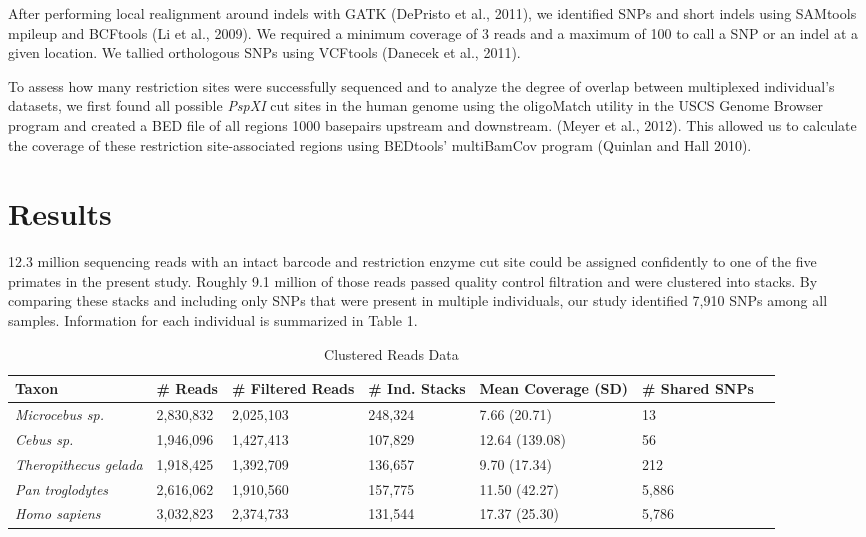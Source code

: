 \documentclass[12pt]{article}
\begin{document}
After performing local realignment around indels with GATK (DePristo et al., 2011), we identified SNPs and short indels using SAMtools mpileup and BCFtools (Li et al., 2009). We required a minimum coverage of 3 reads and a maximum of 100 to call a SNP or an indel at a given location. We tallied orthologous SNPs using VCFtools (Danecek et al., 2011).
	
To assess how many restriction sites were successfully sequenced and to analyze the degree of overlap between multiplexed individual's datasets, we first found all possible \emph{PspXI} cut sites in the human genome using the oligoMatch utility in the USCS Genome Browser program and created a BED file of all regions 1000 basepairs upstream and downstream. (Meyer et al., 2012). This allowed us to calculate the coverage of these restriction site-associated regions using BEDtools' multiBamCov program (Quinlan and Hall 2010).

\section{Results}

12.3 million sequencing reads with an intact barcode and restriction enzyme cut site could be assigned confidently to one of the five primates in the present study. Roughly 9.1 million of those reads passed quality control filtration and were clustered into stacks. By comparing these stacks and including only SNPs that were present in multiple individuals, our study identified 7,910 SNPs among all samples. Information for each individual is summarized in Table 1. 

\begin{table}[h]
\caption{Clustered Reads Data}
\begin{center}
	\small
	\begin{tabular}{ p{3cm} || l || p{1.75cm} | p{1.75cm} || p{1.75cm} | p{1.75cm} | l }
		\hline
		Taxon                       & \# Reads  & \# Filtered Reads & \# Ind. Stacks & Mean Coverage (SD)  & \# Shared SNPs \\ \hline\hline
		\emph{Microcebus sp.}       & 2,830,832 & 2,025,103       & 248,324         &  7.66 (20.71)  & 13    \\ \hline
		\emph{Cebus sp.}            & 1,946,096 & 1,427,413       & 107,829         & 12.64 (139.08) & 56    \\ \hline
		\emph{Theropithecus gelada} & 1,918,425 & 1,392,709       & 136,657         &  9.70 (17.34)  & 212   \\ \hline
		\emph{Pan troglodytes}      & 2,616,062 & 1,910,560       & 157,775         & 11.50 (42.27)  & 5,886 \\ \hline
		\emph{Homo sapiens}         & 3,032,823 & 2,374,733       & 131,544         & 17.37 (25.30)  & 5,786 \\ \hline
	\end{tabular}
\end{center}
\end{table}
\end{document}
